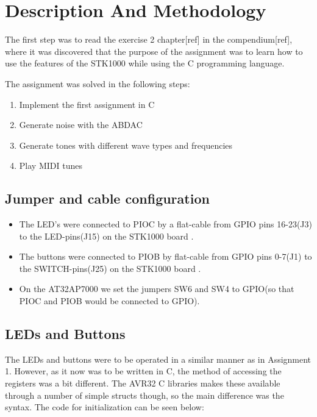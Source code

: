 \documentclass[a4paper,12pt]{article}
\begin{document}
\clearpage
\section{Description And Methodology}

The first step was to read the exercise 2 chapter[ref] in the compendium[ref], where it was discovered that the purpose of the assignment was to learn how to use the features of the STK1000 while using the C programming language.

The assignment was solved in the following steps:
\begin{enumerate}
\item Implement the first assignment in C
\item Generate noise with the ABDAC
\item Generate tones with different wave types and frequencies
\item Play MIDI tunes
\end{enumerate} 

\subsection{Jumper and cable configuration}
\begin{itemize}
\item The LED’s were connected to PIOC by a flat-cable from GPIO pins 16-23(J3) to the LED-pins(J15) on the STK1000 board \cite[section~2.4.1]{compendium}.
\item The buttons were connected to PIOB by flat-cable from GPIO pins 0-7(J1) to the SWITCH-pins(J25) on the STK1000 board \cite[section~2.4.1]{compendium}.
\item On the AT32AP7000 we set the jumpers SW6 and SW4 to GPIO(so that PIOC and PIOB would be connected to GPIO)\cite[table~2.3]{compendium}.
\end{itemize}

\subsection{LEDs and Buttons}

The LEDs and buttons were to be operated in a similar manner as in Assignment 1. However, as it now was to be written in C, the method of accessing the registers was a bit different. The AVR32 C libraries makes these available through a number of simple structs though, so the main difference was the syntax. The code for initialization can be seen below:
\end{document}
